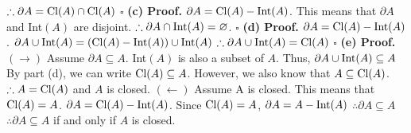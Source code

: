 \documentclass[12pt]{article}
\begin{document}
\newline
\(\therefore \partial A =  \textup{Cl}(A) \cap \textup{Cl}(A)\)
\newline \(\square\) \newline \newline
\textbf{(c) Proof.} \newline
\(\partial A = \textup{Cl}(A) - \textup{Int}(A)\).
\newline
This means that \(\partial A\) and Int\((A)\) are disjoint.
\newline
\(\therefore \partial A \cap \textup{Int}(A) = \varnothing\).
\newline \(\square\) \newline \newline
\textbf{(d) Proof.} \newline
\(\partial A = \textup{Cl}(A) - \textup{Int}(A)\).
\newline
\(\partial A \cup \textup{Int}(A) = (\textup{Cl}(A) - \textup{Int}(A))\cup \textup{Int}(A)\)
\newline
\(\therefore \partial A \cup \textup{Int}(A) = \textup{Cl}(A)\)
\newline \(\square\) \newline \newline
\textbf{(e) Proof.} \newline
\((\rightarrow)\) Assume \(\partial A \subseteq A\).
\newline
Int\((A)\) is also a subset of \(A\).
\newline
Thus, \(\partial A \cup \textup{Int}(A) \subseteq A\)
\newline
By part (d), we can write \(\textup{Cl}(A) \subseteq A\).
\newline
However, we also know that \(A \subseteq \textup{Cl}(A)\).
\newline
\(\therefore A = \textup{Cl}(A)\) and \(A\) is closed.
\newline \newline
\((\leftarrow)\) Assume A is closed.
\newline
This means that \(\textup{Cl}(A) = A\).
\newline
\(\partial A = \textup{Cl}(A) - \textup{Int}(A)\).
\newline
Since \(\textup{Cl}(A) = A\), \(\partial A = A - \textup{Int}(A)\)
\newline
\(\therefore \partial A \subseteq A\)
\newline \newline
\(\therefore \partial A \subseteq A\) if and only if \(A\) is closed.
\end{document}
